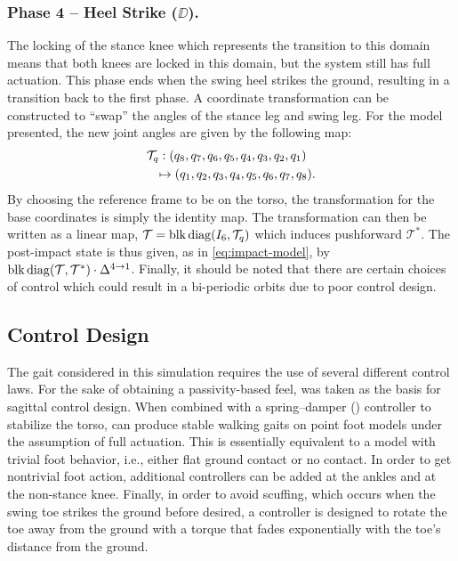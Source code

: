 \subsubsection{Phase 4 -- Heel Strike ($\DD$).}
The locking of the stance knee which represents the transition to this domain
means that both knees are locked in this domain, but the system still has full
actuation.
% 
This phase ends when the swing heel strikes the ground, resulting in a
transition back to the first phase.
% 
A coordinate transformation can be constructed to ``swap'' the angles of the
stance leg and swing leg.
% 
For the model presented, the new joint angles are given by the following map:
% 
\begin{align*}
  \lefteqn{\mathcal{T}_q : (q_8, q_7, q_6, q_5, q_4, q_3, q_2, q_1)}\\
  && \mapsto (q_1, q_2, q_3, q_4, q_5, q_6, q_7, q_8).
\end{align*}
By choosing the reference frame to be on the torso, the transformation for the
base coordinates is simply the identity map.
% 
The transformation can then be written as a linear map, $\mathcal{T} =
\operatorname*{blk\,diag}(I_{6}, {\mathcal{T}_q})$ which induces pushforward $\mathcal{T}^*$.
% 
The post-impact state is thus given, as in \eqref{eq:impact-model}, by
$\operatorname*{blk\,diag}({\mathcal T}, {\mathcal T}^*) \cdot \Delta^{4 \to 1}$.
% 
Finally, it should be noted that there are certain choices of control which
could result in a bi-periodic orbits due to poor control design.

\subsection{Control Design}

The gait considered in this simulation requires the use of several different
control laws.
% 
For the sake of obtaining a passivity-based feel, \csx was taken as the basis
for sagittal control design.
% 
When combined with a spring--damper (\PD) controller to stabilize the torso,
\csx can produce stable walking gaits on point foot models under the assumption
of full actuation.
% 
This is essentially equivalent to a model with trivial foot behavior, i.e.,
either flat ground contact or no contact.
% 
In order to get nontrivial foot action, additional \PDx controllers can be added
at the ankles and at the non-stance knee.
% 
Finally, in order to avoid scuffing, which occurs when the swing toe strikes the
ground before desired, a controller is designed to rotate the toe away from the
ground with a torque that fades exponentially with the toe's distance from the
ground.

